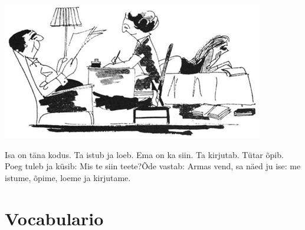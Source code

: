 \begin{center}
\includegraphics{img/L02.png}
\end{center}

Isa on täna kodus. Ta istub ja loeb. Ema on ka siin. Ta kirjutab. Tütar õpib. Poeg tuleb ja küsib: \guillemotleft Mis te siin teete?\guillemotright Õde vastab: \guillemotleft Armas vend, sa näed ju ise: me istume, õpime, loeme ja kirjutame.\guillemotright\\

\Large{\section*{Vocabulario}}

